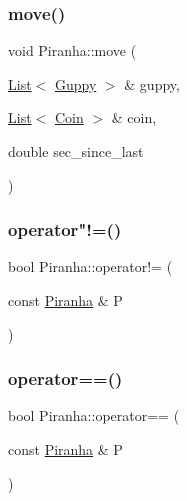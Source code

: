 \mbox{\label{class_piranha_a541bc2d7d15271685dd138e0efd45d85}} 
\subsubsection{\texorpdfstring{move()}{move()}}
{\footnotesize\ttfamily void Piranha\+::move (\begin{DoxyParamCaption}\item[{\mbox{\hyperlink{class_list}{List}}$<$ \mbox{\hyperlink{class_guppy}{Guppy}} $>$ \&}]{guppy,  }\item[{\mbox{\hyperlink{class_list}{List}}$<$ \mbox{\hyperlink{class_coin}{Coin}} $>$ \&}]{coin,  }\item[{double}]{sec\+\_\+since\+\_\+last }\end{DoxyParamCaption})}

\mbox{\label{class_piranha_ab6eac12e7a9d9ce9243a16aebc8c9785}} 
\subsubsection{\texorpdfstring{operator"!=()}{operator!=()}}
{\footnotesize\ttfamily bool Piranha\+::operator!= (\begin{DoxyParamCaption}\item[{const \mbox{\hyperlink{class_piranha}{Piranha}} \&}]{P }\end{DoxyParamCaption})}

\mbox{\label{class_piranha_aa3789de8579639dcf38cde05b6869859}} 
\subsubsection{\texorpdfstring{operator==()}{operator==()}\hspace{0.1cm}{\footnotesize\ttfamily [1/2]}}
{\footnotesize\ttfamily bool Piranha\+::operator== (\begin{DoxyParamCaption}\item[{const \mbox{\hyperlink{class_piranha}{Piranha}} \&}]{P }\end{DoxyParamCaption})}

